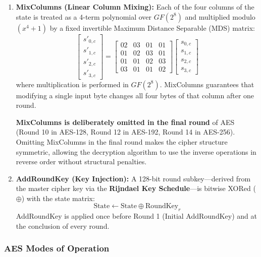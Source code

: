 \begin{enumerate}
\item \textbf{MixColumns (Linear Column Mixing):}
Each of the four columns of the state is treated as a 4-term polynomial over $GF(2^8)$ and multiplied modulo $(x^4 + 1)$ by a fixed invertible Maximum Distance Separable (MDS) matrix:
\[
\begin{bmatrix}
s'_{0,c} \\ s'_{1,c} \\ s'_{2,c} \\ s'_{3,c}
\end{bmatrix}
=
\begin{bmatrix}
02 & 03 & 01 & 01 \\
01 & 02 & 03 & 01 \\
01 & 01 & 02 & 03 \\
03 & 01 & 01 & 02
\end{bmatrix}
\begin{bmatrix}
s_{0,c} \\ s_{1,c} \\ s_{2,c} \\ s_{3,c}
\end{bmatrix}
\]
where multiplication is performed in $GF(2^8)$. MixColumns guarantees that modifying a single input byte changes all four bytes of that column after one round.
\begin{tcolorbox}[colback=yellow!10!white,colframe=yellow!50!black,title=\textbf{Crucial Examination Invariant: MixColumns in the Final Round}]
\textbf{MixColumns is deliberately omitted in the final round} of AES (Round 10 in AES-128, Round 12 in AES-192, Round 14 in AES-256). Omitting MixColumns in the final round makes the cipher structure symmetric, allowing the decryption algorithm to use the inverse operations in reverse order without structural penalties.
\end{tcolorbox}

\item \textbf{AddRoundKey (Key Injection):}
A 128-bit round subkey—derived from the master cipher key via the \textbf{Rijndael Key Schedule}—is bitwise XORed ($\oplus$) with the state matrix:
\[ \text{State} \leftarrow \text{State} \oplus \text{RoundKey}_r \]
AddRoundKey is applied once before Round 1 (Initial AddRoundKey) and at the conclusion of every round.
\end{enumerate}

\subsubsection{AES Modes of Operation}

